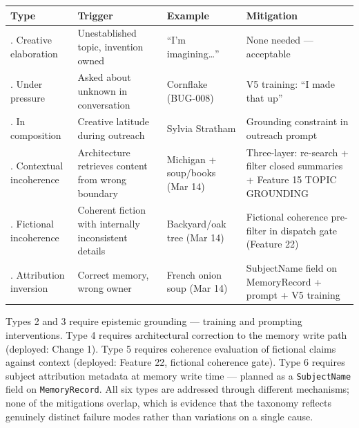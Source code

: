 \begin{longtable}[]{@{}
  >{\raggedright\arraybackslash}p{}
  >{\raggedright\arraybackslash}p{}
  >{\raggedright\arraybackslash}p{}
  >{\raggedright\arraybackslash}p{}@{}}
\toprule\noalign{}
\begin{minipage}[b]{\linewidth}\raggedright
Type
\end{minipage} & \begin{minipage}[b]{\linewidth}\raggedright
Trigger
\end{minipage} & \begin{minipage}[b]{\linewidth}\raggedright
Example
\end{minipage} & \begin{minipage}[b]{\linewidth}\raggedright
Mitigation
\end{minipage} \\
\midrule\noalign{}
\endhead
\bottomrule\noalign{}
\endlastfoot
1. Creative elaboration & Unestablished topic, invention owned & ``I'm
imagining\ldots{}'' & None needed --- acceptable \\
2. Under pressure & Asked about unknown in conversation & Cornflake
(BUG-008) & V5 training: ``I made that up'' \\
3. In composition & Creative latitude during outreach & Sylvia Stratham
& Grounding constraint in outreach prompt \\
4. Contextual incoherence & Architecture retrieves content from wrong
boundary & Michigan + soup/books (Mar 14) & Three-layer: re-search +
filter closed summaries + Feature 15 TOPIC GROUNDING \\
5. Fictional incoherence & Coherent fiction with internally inconsistent
details & Backyard/oak tree (Mar 14) & Fictional coherence pre-filter in
dispatch gate (Feature 22) \\
6. Attribution inversion & Correct memory, wrong owner & French onion
soup (Mar 14) & SubjectName field on MemoryRecord + prompt + V5
training \\
\end{longtable}

Types 2 and 3 require epistemic grounding --- training and prompting
interventions. Type 4 requires architectural correction to the memory
write path (deployed: Change 1). Type 5 requires coherence evaluation of
fictional claims against context (deployed: Feature 22, fictional
coherence gate). Type 6 requires subject attribution metadata at memory
write time --- planned as a \texttt{SubjectName} field on
\texttt{MemoryRecord}. All six types are addressed through different
mechanisms; none of the mitigations overlap, which is evidence that the
taxonomy reflects genuinely distinct failure modes rather than
variations on a single cause.

